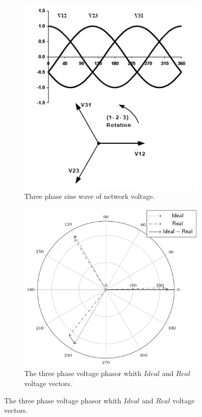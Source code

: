 	\begin{figure}[h!]
     \centering
		\begin{subfigure}[b]{0.49\textwidth}
         \centering
         \includegraphics[width=\textwidth]{Unblance_EPS_Pics/Three-phase-voltage-system_gray.png}
         \caption{Three phase sine wave of network voltage.}
         \label{BASICUNB:fig:UnbWave}
     \end{subfigure}
		\hfill
     \begin{subfigure}[b]{0.49\textwidth}
         \centering
         \includegraphics[width=\textwidth]{Unblance_EPS_Pics/PhasorGrayscale.jpg}
         \caption{The three phase voltage phasor whith $Ideal$ and $Real$ voltage vectors.}
         \label{BASICUNB:fig:UnbPhasor}
     \end{subfigure}    
        \label{BASICUNB:fig:UnbPhasor_all}
\end{figure}
